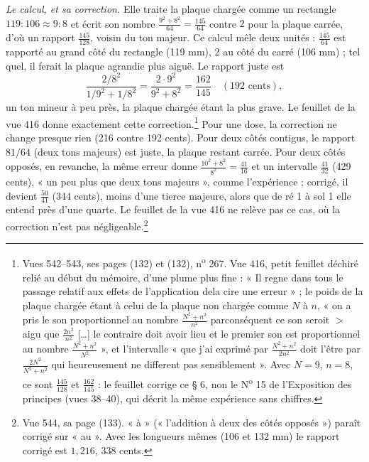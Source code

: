 \documentclass[11pt,a4paper]{article}
\begin{document}
\emph{Le calcul, et sa correction.} Elle traite la plaque chargée comme un
rectangle $119:106 \approx 9:8$ et écrit son nombre $\frac{9^2+8^2}{64} =
\frac{145}{64}$ contre $2$ pour la plaque carrée, d'où un rapport $\frac{145}{128}$,
voisin du ton majeur. Ce calcul mêle deux unités : $\frac{145}{64}$ est rapporté
au grand côté du rectangle (119 mm), $2$ au côté du carré (106 mm) ; tel quel,
il ferait la plaque agrandie plus aiguë. Le rapport juste est
\[
\frac{2/8^2}{1/9^2+1/8^2} = \frac{2\cdot 9^2}{9^2+8^2} = \frac{162}{145}
\quad (192 \text{ cents}),
\]
un ton mineur à peu près, la plaque chargée étant la plus grave. Le feuillet de
la vue 416 donne exactement cette correction.\footnote{Vues 542--543, ses pages
(132) et (132), n\textsuperscript{o} 267. Vue 416, petit feuillet déchiré relié
au début du mémoire, d'une plume plus fine : « Il regne dans tous le passage
relatif aux effets de l'application dela cire une erreur » ; le poids de la
plaque chargée étant à celui de la plaque non chargée comme $N$ à $n$, « on a
pris le son proportionnel au nombre $\frac{N^2+n^2}{n^2}$ parconséquent ce son
seroit $>$ aigu que $\frac{2n^2}{n^2}$ […] le contraire doit avoir lieu et le
premier son est proportionnel au nombre $\frac{N^2+n^2}{N^2}$ », et l'intervalle
« que j'ai exprimé par $\frac{N^2+n^2}{2n^2}$ doit l'être par
$\frac{2N^2}{N^2+n^2}$ qui heureusement ne different pas sensiblement ». Avec
$N=9$, $n=8$, ce sont $\frac{145}{128}$ et $\frac{162}{145}$ : le feuillet
corrige ce § 6, non le N\textsuperscript{o} 15 de l'Exposition des principes
(vues 38--40), qui décrit la même expérience sans chiffres.} Pour une dose, la
correction ne change presque rien (216 contre 192 cents). Pour deux côtés
contigus, le rapport $81/64$ (deux tons majeurs) est juste, la plaque restant
carrée. Pour deux côtés opposés, en revanche, la même erreur donne
$\frac{10^2+8^2}{8^2} = \frac{41}{16}$ et un intervalle $\frac{41}{32}$ (429
cents), « un peu plus que deux tons majeurs », comme l'expérience ; corrigé, il
devient $\frac{50}{41}$ (344 cents), moins d'une tierce majeure, alors que de
ré 1 à sol 1 elle entend près d'une quarte. Le feuillet de la vue 416 ne relève
pas ce cas, où la correction n'est pas négligeable.\footnote{Vue 544, sa page
(133). « à » (« l'addition à deux des côtés opposés ») paraît corrigé sur « au ».
Avec les longueurs mêmes (106 et 132 mm) le rapport corrigé est $1{,}216$, 338
cents.}
\end{document}
